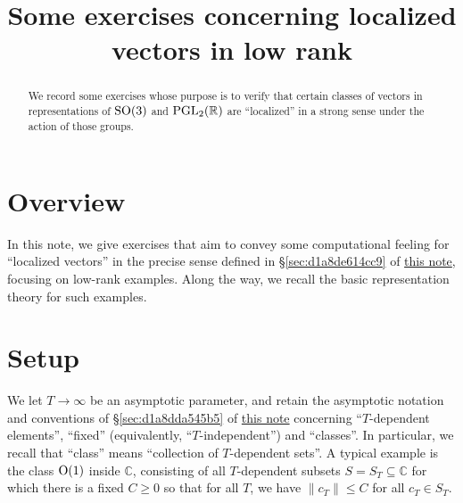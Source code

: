 \documentclass[reqno]{amsart} 
\title{Some exercises concerning localized vectors in low rank}
\numberwithin{equation}{section}
\begin{document}
\maketitle
\tableofcontents


\begin{abstract}
  We record some exercises whose purpose is to verify that certain classes of vectors in representations of $\operatorname{SO}(3)$ and $\operatorname{PGL}_2(\mathbb{R})$ are ``localized'' in a strong sense under the action of those groups.
\end{abstract}

\section{Overview}\label{sec:d1a9162ede03}

In this note, we give exercises that aim to convey some computational feeling for ``localized vectors'' in the precise sense defined in \S\ref{sec:d1a8de614cc9} of \href{20230522T150333__microlocal-localized-vectors.pdf}{this note}, focusing on low-rank examples.  Along the way, we recall the basic representation theory for such examples.

\section{Setup}\label{sec:d1a94d0b364d}
We let $T \rightarrow \infty$ be an asymptotic parameter, and retain the asymptotic notation and conventions of \S\ref{sec:d1a8dda545b5} of \href{20230522T150333__microlocal-localized-vectors.pdf}{this note} concerning ``$T$-dependent elements'', ``fixed'' (equivalently, ``$T$-independent'') and ``classes''.  In particular, we recall that ``class'' means ``collection of $T$-dependent sets''.  A typical example is the class $\operatorname{O}(1)$ inside $\mathbb{C}$, consisting of all $T$-dependent subsets $S = S_T \subseteq \mathbb{C}$ for which there is a fixed $C \geq 0$ so that for all $T$, we have $\lVert c_T \rVert \leq C$ for all $c_T \in S_T$.
\end{document}
